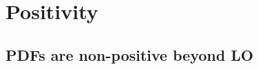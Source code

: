 
\chapter{Positivity}
\label{ch:pos}
\minitoc
\adjustmtc

\section{PDFs are non-positive beyond LO}
\label{sec:pos/intro}

